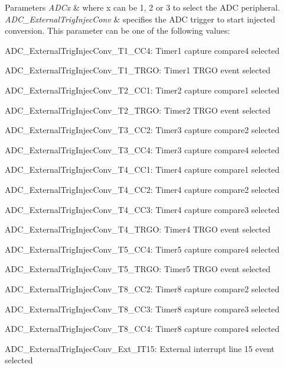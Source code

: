 \begin{DoxyParams}{Parameters}
{\em A\+D\+Cx} & where x can be 1, 2 or 3 to select the A\+DC peripheral. \\
\hline
{\em A\+D\+C\+\_\+\+External\+Trig\+Injec\+Conv} & specifies the A\+DC trigger to start injected conversion. This parameter can be one of the following values\+: \begin{DoxyItemize}
\item A\+D\+C\+\_\+\+External\+Trig\+Injec\+Conv\+\_\+\+T1\+\_\+\+C\+C4\+: Timer1 capture compare4 selected \item A\+D\+C\+\_\+\+External\+Trig\+Injec\+Conv\+\_\+\+T1\+\_\+\+T\+R\+GO\+: Timer1 T\+R\+GO event selected \item A\+D\+C\+\_\+\+External\+Trig\+Injec\+Conv\+\_\+\+T2\+\_\+\+C\+C1\+: Timer2 capture compare1 selected \item A\+D\+C\+\_\+\+External\+Trig\+Injec\+Conv\+\_\+\+T2\+\_\+\+T\+R\+GO\+: Timer2 T\+R\+GO event selected \item A\+D\+C\+\_\+\+External\+Trig\+Injec\+Conv\+\_\+\+T3\+\_\+\+C\+C2\+: Timer3 capture compare2 selected \item A\+D\+C\+\_\+\+External\+Trig\+Injec\+Conv\+\_\+\+T3\+\_\+\+C\+C4\+: Timer3 capture compare4 selected \item A\+D\+C\+\_\+\+External\+Trig\+Injec\+Conv\+\_\+\+T4\+\_\+\+C\+C1\+: Timer4 capture compare1 selected \item A\+D\+C\+\_\+\+External\+Trig\+Injec\+Conv\+\_\+\+T4\+\_\+\+C\+C2\+: Timer4 capture compare2 selected \item A\+D\+C\+\_\+\+External\+Trig\+Injec\+Conv\+\_\+\+T4\+\_\+\+C\+C3\+: Timer4 capture compare3 selected \item A\+D\+C\+\_\+\+External\+Trig\+Injec\+Conv\+\_\+\+T4\+\_\+\+T\+R\+GO\+: Timer4 T\+R\+GO event selected \item A\+D\+C\+\_\+\+External\+Trig\+Injec\+Conv\+\_\+\+T5\+\_\+\+C\+C4\+: Timer5 capture compare4 selected \item A\+D\+C\+\_\+\+External\+Trig\+Injec\+Conv\+\_\+\+T5\+\_\+\+T\+R\+GO\+: Timer5 T\+R\+GO event selected \item A\+D\+C\+\_\+\+External\+Trig\+Injec\+Conv\+\_\+\+T8\+\_\+\+C\+C2\+: Timer8 capture compare2 selected \item A\+D\+C\+\_\+\+External\+Trig\+Injec\+Conv\+\_\+\+T8\+\_\+\+C\+C3\+: Timer8 capture compare3 selected \item A\+D\+C\+\_\+\+External\+Trig\+Injec\+Conv\+\_\+\+T8\+\_\+\+C\+C4\+: Timer8 capture compare4 selected \item A\+D\+C\+\_\+\+External\+Trig\+Injec\+Conv\+\_\+\+Ext\+\_\+\+I\+T15\+: External interrupt line 15 event selected \end{DoxyItemize}
\\
\hline
\end{DoxyParams}


